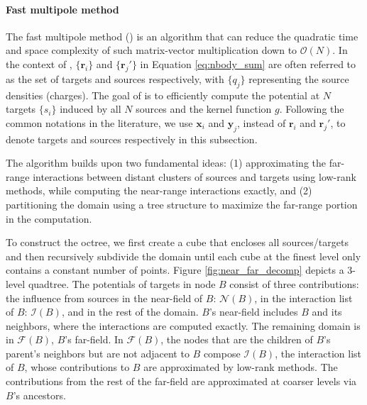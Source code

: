 \paragraph{Fast multipole method}

The fast multipole method (\fmm) is an algorithm that can reduce the quadratic time and space complexity of such matrix-vector multiplication down to $\mathcal{O}(N)$.
In the context of \fmm, $\{\mathbf{r}_i\}$ and $\{\mathbf{r}_j'\}$ in Equation \ref{eq:nbody_sum} are often referred to as the set of targets and sources respectively, with $\{q_j\}$ representing the source densities (charges).
The goal of \fmm is to efficiently compute the potential at $N$ targets $\{s_i\}$ induced by all $N$ sources and the kernel function $g$.
Following the common notations in the literature, we use $\mathbf{x}_i$ and $\mathbf{y}_j$, instead of $\mathbf{r}_i$ and $\mathbf{r}_j'$, to denote targets and sources respectively in this subsection.

The \fmm algorithm builds upon two fundamental ideas: (1) approximating the far-range interactions between distant clusters of sources and targets using low-rank methods, while computing the near-range interactions exactly, and (2) partitioning the domain using a tree structure to maximize the far-range portion in the computation.

To construct the octree, we first create a cube that encloses all sources/targets and then recursively subdivide the domain until each cube at the finest level only contains a constant number of points.
Figure \ref{fig:near_far_decomp} depicts a 3-level quadtree.
The potentials of targets in node $B$ consist of three contributions: the influence from sources in the near-field of $B$: $\mathcal{N}(B)$, in the interaction list of $B$: $\mathcal{I}(B)$, and in the rest of the domain.
$B$'s near-field includes $B$ and its neighbors, where the interactions are computed exactly.
The remaining domain is in $\mathcal{F}(B)$, $B$'s far-field.
In $\mathcal{F}(B)$, the nodes that are the children of $B$'s parent's neighbors but are not adjacent to $B$ compose $\mathcal{I}(B)$, the interaction list of $B$, whose contributions to $B$ are approximated by low-rank methods.
The contributions from the rest of the far-field are approximated at coarser levels via $B$'s ancestors.

